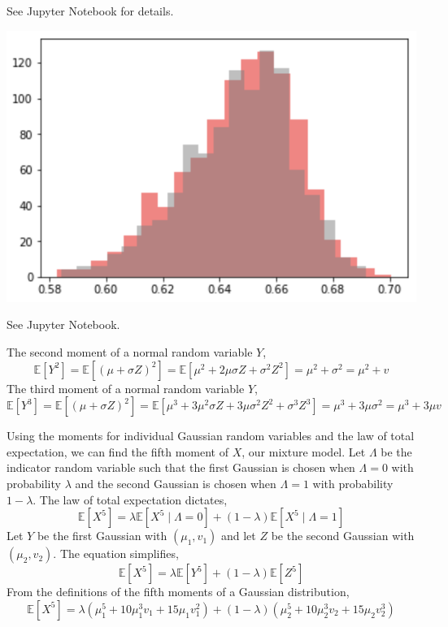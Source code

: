 \documentclass[12pt,twoside]{article}
\begin{document}
\begin{problems}
\begin{problemparts}
See Jupyter Notebook for details.

\begin{center}
    \includegraphics[scale=0.75]{PS1P3E.png}
\end{center}

\problempart %

See Jupyter Notebook.

\problempart %

The second moment of a normal random variable $Y$,
$$ \mathbb{E}[Y^2] = \mathbb{E}[(\mu + \sigma Z)^2] = \mathbb{E}[\mu^2 + 2 \mu 
\sigma Z  + \sigma^2 Z^2] = \mu^2 + \sigma^2 = \mu^2 + v $$
The third moment of a normal random variable $Y$,
$$ \mathbb{E}[Y^3] = \mathbb{E}[(\mu + \sigma Z)^2] = \mathbb{E}[\mu^3 + 3 
\mu^2 \sigma Z + 3 \mu \sigma^2 Z^2 + \sigma^3 Z^3] = \mu^3 + 3 \mu \sigma^2 =
\mu^3 + 3 \mu v $$

Using the moments for individual Gaussian random variables and the law of
total expectation, we can find the fifth moment of $X$, our mixture model. 
Let $\Lambda$ be the indicator random variable such that the first Gaussian 
is chosen when $\Lambda = 0$ with probability $\lambda$ and the second 
Gaussian is chosen when $\Lambda = 1$ with probability $1 - \lambda$. The
law of total expectation dictates,
$$ \mathbb{E}[X^5] = \lambda \mathbb{E}[X^5 \mid \Lambda = 0] + (1 - 
\lambda) \mathbb{E}[X^5 \mid \Lambda = 1] $$
Let $Y$ be the first Gaussian with $(\mu_1, v_1)$ and let $Z$ be the second
Gaussian with $(\mu_2, v_2)$. The equation simplifies,
$$ \mathbb{E}[X^5] = \lambda \mathbb{E}[Y^5] + (1 - \lambda) \mathbb{E}[Z^5] $$
From the definitions of the fifth moments of a Gaussian distribution,
$$ \mathbb{E}[X^5] = \lambda (\mu_1^5 + 10 \mu_1^3 v_1 + 15 \mu_1 v_1^2) + (1
- \lambda) (\mu_2^5 + 10 \mu_2^3 v_2 + 15 \mu_2 v_2^3) $$


\end{problemparts}
\end{problems}
\end{document}
